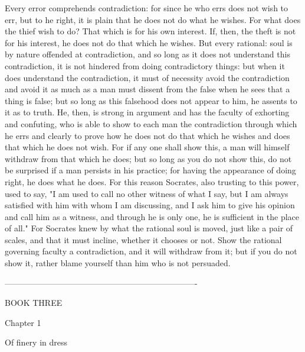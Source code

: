 \documentclass[a4paper]{article}
\begin{document}
    Every error comprehends contradiction: for since he who errs does not wish
to err, but to he right, it is plain that he does not do what he wishes. For
what does the thief wish to do? That which is for his own interest. If, then,
the theft is not for his interest, he does not do that which he wishes. But
every rational: soul is by nature offended at contradiction, and so long as it
does not understand this contradiction, it is not hindered from doing
contradictory things: but when it does understand the contradiction, it must of
necessity avoid the contradiction and avoid it as much as a man must dissent
from the false when he sees that a thing is false; but so long as this
falsehood does not appear to him, he assents to it as to truth.
    He, then, is strong in argument and has the faculty of exhorting and
confuting, who is able to show to each man the contradiction through which he
errs and clearly to prove how he does not do that which he wishes and does that
which he does not wish. For if any one shall show this, a man will himself
withdraw from that which he does; but so long as you do not show this, do not
be surprised if a man persists in his practice; for having the appearance of
doing right, he does what he does. For this reason Socrates, also trusting to
this power, used to say, "I am used to call no other witness of what I say, but
I am always satisfied with him with whom I am discussing, and I ask him to give
his opinion and call him as a witness, and through he is only one, he is
sufficient in the place of all." For Socrates knew by what the rational soul is
moved, just like a pair of scales, and that it must incline, whether it chooses
or not. Show the rational governing faculty a contradiction, and it will
withdraw from it; but if you do not show it, rather blame yourself than him who
is not persuaded.

----------------------------------------------------------------------

BOOK THREE

Chapter 1

Of finery in dress
\end{document}
